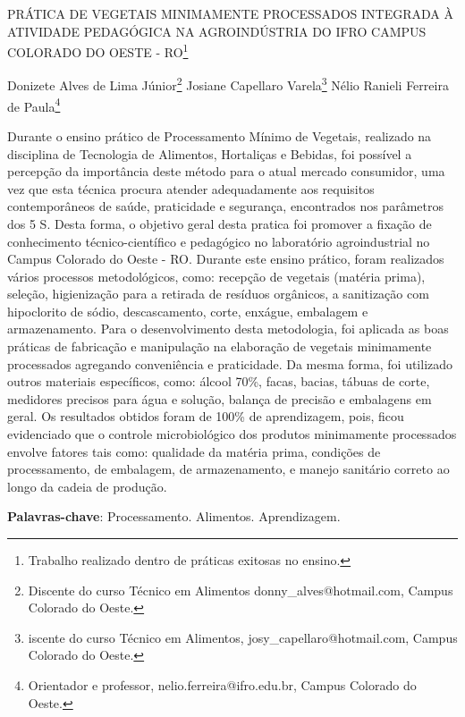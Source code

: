 \documentclass[article,12pt,onesidea,4paper,english,brazil]{abntex2}
\begin{document}
	
	
	\frenchspacing 
	
	\begin{center}
		\LARGE PRÁTICA DE VEGETAIS MINIMAMENTE PROCESSADOS INTEGRADA À ATIVIDADE PEDAGÓGICA NA AGROINDÚSTRIA DO IFRO CAMPUS COLORADO DO OESTE - RO\footnote{Trabalho realizado dentro de práticas exitosas no ensino.}
		
		\normalsize
		Donizete Alves de Lima Júnior\footnote{Discente do curso Técnico em Alimentos donny\_alves@hotmail.com, Campus Colorado do Oeste.} 
		Josiane Capellaro Varela\footnote{iscente do curso Técnico em Alimentos, josy\_capellaro@hotmail.com, Campus Colorado do Oeste.} 
		Nélio Ranieli Ferreira de Paula\footnote{Orientador e professor, nelio.ferreira@ifro.edu.br, Campus Colorado do Oeste.} 
	\end{center}
	
	\noindent Durante o ensino prático de Processamento Mínimo de Vegetais, realizado na disciplina de Tecnologia de Alimentos, Hortaliças e Bebidas, foi possível a percepção da importância deste método para o atual mercado consumidor, uma vez que esta técnica procura atender adequadamente aos requisitos contemporâneos de saúde, praticidade e segurança, encontrados nos parâmetros dos 5 S. Desta forma, o objetivo geral desta pratica foi promover a fixação de conhecimento técnico-científico e pedagógico no laboratório agroindustrial no Campus Colorado do Oeste - RO. Durante este ensino prático, foram realizados vários processos metodológicos, como: recepção de vegetais (matéria prima), seleção, higienização para a retirada de resíduos orgânicos, a sanitização com hipoclorito de sódio, descascamento, corte, enxágue, embalagem e armazenamento. Para o desenvolvimento desta metodologia, foi aplicada as boas práticas de fabricação e manipulação na elaboração de vegetais minimamente processados agregando conveniência e praticidade. Da mesma forma, foi utilizado outros materiais específicos, como: álcool 70\%, facas, bacias, tábuas de corte, medidores precisos para água e solução, balança de precisão e embalagens em geral. Os resultados obtidos foram de 100\% de aprendizagem, pois, ficou evidenciado que o controle microbiológico dos produtos minimamente processados envolve fatores tais como: qualidade da matéria prima, condições de processamento, de embalagem, de armazenamento, e manejo sanitário correto ao longo da cadeia de produção.
	
	\vspace{\onelineskip}
	
	\noindent
	\textbf{Palavras-chave}: Processamento. Alimentos. Aprendizagem.
	
\end{document}
